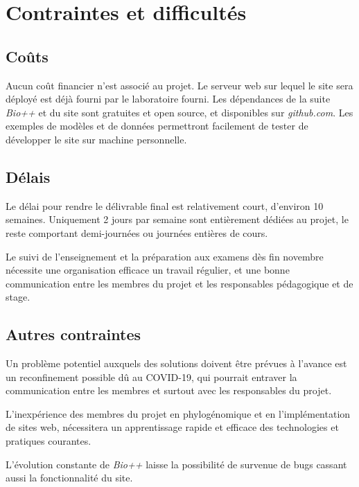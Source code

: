 \section{Contraintes et difficultés}

\subsection{Coûts}

Aucun coût financier n'est associé au projet.
Le serveur web sur lequel le site sera déployé est déjà fourni par le laboratoire fourni.
Les dépendances de la suite \textit{Bio++} et du site sont gratuites et open source,
et disponibles sur \textit{github.com}.
Les exemples de modèles et de données permettront facilement
de tester de développer le site sur machine personnelle.


\subsection{Délais}

Le délai pour rendre le délivrable final est relativement court,
d'environ 10 semaines.
Uniquement 2 jours par semaine sont entièrement dédiées au projet,
le reste comportant demi-journées ou journées entières de cours.

Le suivi de l'enseignement et la préparation
aux examens dès fin novembre
nécessite une organisation efficace
un travail régulier,
et une bonne communication entre les membres du projet
et les responsables pédagogique et de stage.


\subsection{Autres contraintes}

Un problème potentiel auxquels des solutions doivent être prévues à l'avance
est un reconfinement possible dû au COVID-19,
qui pourrait entraver la communication entre les membres
et surtout avec les responsables du projet.

L'inexpérience des membres du projet en phylogénomique
et en l'implémentation de sites web,
nécessitera un apprentissage rapide et efficace
des technologies et pratiques courantes.

L'évolution constante de \textit{Bio++}
laisse la possibilité de survenue de bugs
cassant aussi la fonctionnalité du site.
